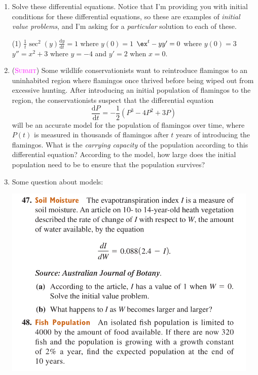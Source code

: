 \begin{enumerate}
    \item 
        Solve these differential equations.
        Notice that I'm providing you with initial conditions 
        for these differential equations, so these are examples
        of \emph{initial value problems}, and I'm asking for a
        \emph{particular} solution to each of these.
        \begin{tasks}(1)
            \task $\frac{1}{t}\sec^2(y)\frac{\mathrm{d}y}{\mathrm{d}t} = 1$ 
            where $y(0)=1$
            \task $\ex^t - yy' = 0$ where $y(0) = 3$
            \task $y'' =  x^2 + 3$ where $y=-4$ and $y'=2$ when $x=0$.
        \end{tasks}

    \item 
        (\textsc{\textcolor{magenta}{Submit}})
        Some wildlife conservationists want to reintroduce 
        flamingos to an uninhabited region where flamingos once thrived
        before being wiped out from excessive hunting.
        After introducing an initial population of flamingos to the region,
        the conservationists suspect that the differential equation
        \begin{equation*}
            \frac{\mathrm{d}P}{\mathrm{d}t} 
            = -\frac{1}{2}\left(P^3-4P^2+3P\right)
        \end{equation*}
        will be an accurate model for the population of flamingos over time, 
        where $P(t)$ is measured in thousands of flamingos 
        after $t$ years of introducing the flamingos.
        What is the \emph{carrying capacity} of the population
        according to this differential equation?
        According to the model, how large does the initial population need to be
        to ensure that the population survives?

    \item 
        Some question about models:
        \begin{center}
            \includegraphics[width=0.96\textwidth]{screenshots/4748.png}
        \end{center}


\end{enumerate}
